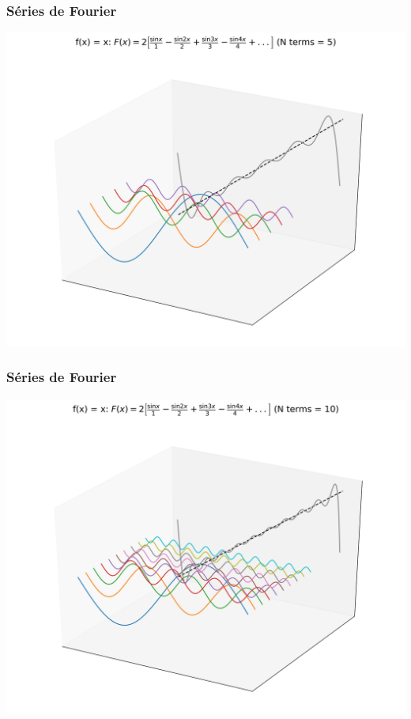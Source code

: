 \documentclass{beamer}
\begin{document}
\begin{frame}
\frametitle{Séries de Fourier}
\begin{center}
\includegraphics[scale=0.4]{Figuras/x5.jpg}
\end{center}
\end{frame}
\begin{frame}
\frametitle{Séries de Fourier}
\begin{center}
\includegraphics[scale=0.4]{Figuras/x10.jpg}
\end{center}
\end{frame}
\end{document}
